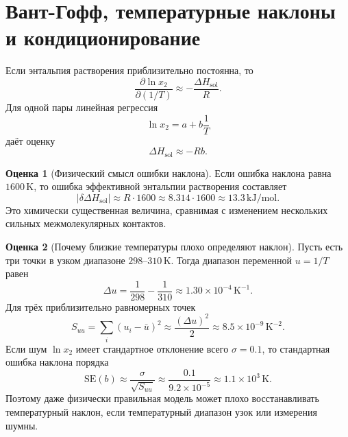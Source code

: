 \documentclass[11pt]{article}
\newcommand{\abs}[1]{\left\lvert #1 \right\rvert}
\theoremstyle{definition}
\newtheorem{estimate}{Оценка}[section]
\begin{document}
\section{Вант-Гофф, температурные наклоны и кондиционирование}
\label{app:vant-hoff}

Если энтальпия растворения приблизительно постоянна, то
\begin{equation*}
    \frac{\partial \ln x_2}{\partial (1/T)}\approx -\frac{\Delta H_{\mathrm{sol}}}{R}.
\end{equation*}
Для одной пары линейная регрессия
\begin{equation*}
    \ln x_2 = a + b\frac{1}{T}
\end{equation*}
даёт оценку
\begin{equation*}
    \Delta H_{\mathrm{sol}}\approx -Rb.
\end{equation*}

\begin{estimate}[Физический смысл ошибки наклона]
Если ошибка наклона равна $1600\,\mathrm{K}$, то ошибка эффективной энтальпии растворения составляет
\begin{equation*}
    \abs{\delta\Delta H_{\mathrm{sol}}}
    \approx R\cdot 1600
    \approx 8.314\cdot 1600
    \approx 13.3\,\mathrm{kJ/mol}.
\end{equation*}
Это химически существенная величина, сравнимая с изменением нескольких сильных межмолекулярных контактов.
\end{estimate}

\begin{estimate}[Почему близкие температуры плохо определяют наклон]
Пусть есть три точки в узком диапазоне $298$--$310\,\mathrm{K}$. Тогда диапазон переменной $u=1/T$ равен
\begin{equation*}
    \Delta u = \frac{1}{298}-\frac{1}{310}\approx 1.30\times10^{-4}\,\mathrm{K}^{-1}.
\end{equation*}
Для трёх приблизительно равномерных точек
\begin{equation*}
    S_{uu}=\sum_i(u_i-\bar u)^2 \approx \frac{(\Delta u)^2}{2}
    \approx 8.5\times10^{-9}\,\mathrm{K}^{-2}.
\end{equation*}
Если шум $\ln x_2$ имеет стандартное отклонение всего $\sigma=0.1$, то стандартная ошибка наклона порядка
\begin{equation*}
    \mathrm{SE}(b)\approx \frac{\sigma}{\sqrt{S_{uu}}}
    \approx \frac{0.1}{9.2\times10^{-5} }
    \approx 1.1\times10^3\,\mathrm{K}.
\end{equation*}
Поэтому даже физически правильная модель может плохо восстанавливать температурный наклон, если температурный диапазон узок или измерения шумны.
\end{estimate}
\end{document}
